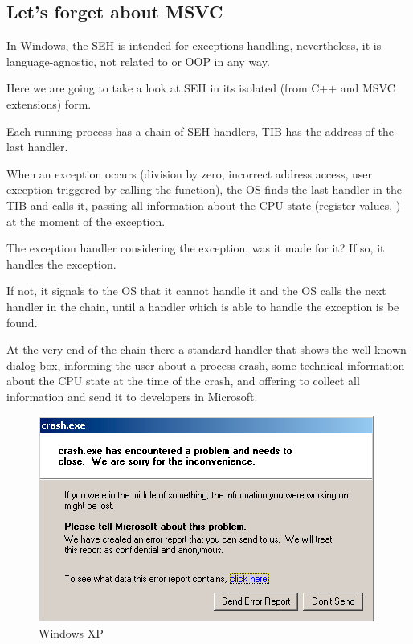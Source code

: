 \subsection{Let's forget about MSVC}

In Windows, the \ac{SEH} is intended for exceptions handling, nevertheless, it is language-agnostic,
not related to \Cpp or \ac{OOP} in any way.

Here we are going to take a look at \ac{SEH} in its isolated (from C++ and MSVC extensions) form.


Each running process has a chain of \ac{SEH} handlers, \ac{TIB} has the address of the last handler.

When an exception occurs (division by zero, incorrect address access, user exception triggered by
calling the  function), the \ac{OS} finds the last handler in the \ac{TIB} and calls it,
passing all information about the \ac{CPU} state (register values, \etc{}) at the moment of the exception.

The exception handler considering the exception, was it made for it?
If so, it handles the exception.

If not, it signals to the \ac{OS} that it
cannot handle it and the \ac{OS} calls the next handler in the chain,
until a handler which is able to handle the exception is be found.

At the very end of the chain there a standard handler that shows the well-known dialog box, informing the user about a
process crash, some technical information about the \ac{CPU} state at the time of the crash,
and offering to collect all information and send it to developers in Microsoft. 

\begin{figure}[H]
\centering
\includegraphics[scale=\NormalScale]{OS/SEH/1/crash_xp1.png}
\caption{Windows XP}
\end{figure}

